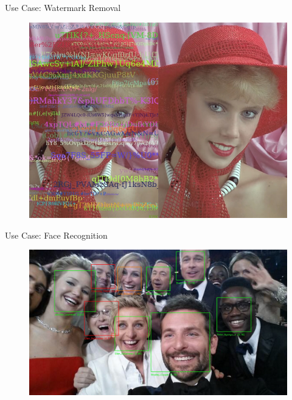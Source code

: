 \begin{frame}{Use Case: Watermark Removal}{}
	\begin{figure}
		\centering
		\includegraphics[scale=0.25]{10_deep_learning/02_img/watermark_removal}
	\end{figure}
\end{frame}


\begin{frame}{Use Case: Face Recognition}{}
	\begin{figure}
		\centering
		\includegraphics[scale=0.10]{10_deep_learning/02_img/face_recognition}
	\end{figure}
\end{frame}


